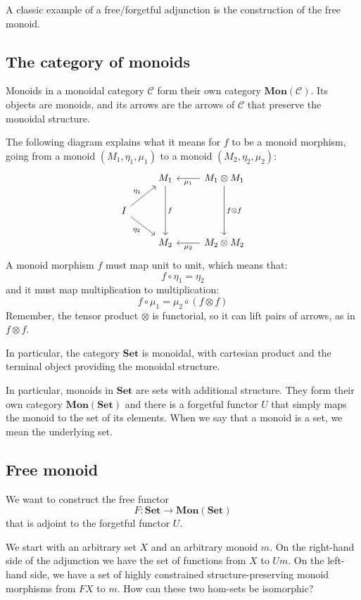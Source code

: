 \documentclass[DaoFP]{subfiles}
\begin{document}
A classic example of a free/forgetful adjunction is the construction of the free monoid.


\subsection{The category of monoids}
Monoids in a monoidal category $\mathcal{C}$ form their own category $\mathbf{Mon}(\mathcal{C})$. Its objects are monoids, and its arrows are the arrows of $\mathcal{C}$ that preserve the monoidal structure. 

The following diagram explains what it means for $f$ to be a monoid morphism, going from a monoid $(M_1, \eta_1, \mu_1)$ to a monoid $(M_2, \eta_2, \mu_2)$:
\[
 \begin{tikzcd}
 & M_1
 \arrow[dd, "f"]
 & M_1 \otimes M_1
 \arrow[l, "\mu_1"]
 \arrow[dd, "f \otimes f"]
 \\
 I
 \arrow[ru, "\eta_1"]
 \arrow[rd, "\eta_2"']
 \\
 & M_2
 & M_2 \otimes M_2
 \arrow[l, "\mu_2"]
  \end{tikzcd}
\]
A monoid morphism $f$ must map unit to unit, which means that:
\[ f \circ \eta_1 = \eta_2 \]
and it must map multiplication to multiplication:
\[ f \circ \mu_1 = \mu_2 \circ (f \otimes f)\]
Remember, the tensor product $\otimes$ is functorial, so it can lift pairs of arrows, as in $f \otimes f$.

In particular, the category $\mathbf{Set}$ is monoidal, with cartesian product and the terminal object providing the monoidal structure. 

In particular, monoids in $\mathbf{Set}$ are sets with additional structure. They form their own category $\mathbf{Mon}(\mathbf{Set})$ and there is a forgetful functor $U$ that simply maps the monoid to the set of its elements. When we say that a monoid is a set, we mean the underlying set.

\subsection{Free monoid}

We want to construct the free functor 
\[ F \colon \mathbf{Set} \to \mathbf{Mon}(\mathbf{Set})\]
that is adjoint to the forgetful functor $U$. 

We start with an arbitrary set $X$ and an arbitrary monoid $m$. On the right-hand side of the adjunction we have the set of functions from $X$ to $U m$. On the left-hand side, we have a set of highly constrained structure-preserving monoid morphisms from $F X$ to $m$. How can these two hom-sets be isomorphic?
\end{document}
